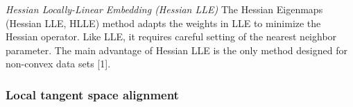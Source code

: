 \documentclass[journal, a4paper]{IEEEtran}
\begin{document}
%	
%	


\textit{Hessian Locally-Linear Embedding (Hessian LLE)}
The Hessian Eigenmaps (Hessian LLE, HLLE) method adapts the weights in LLE to minimize the Hessian operator. Like LLE, it requires careful setting of the nearest neighbor parameter. The main advantage of Hessian LLE is the only method designed for non-convex data sets [1].



\subsubsection{Local tangent space alignment}
\end{document}
